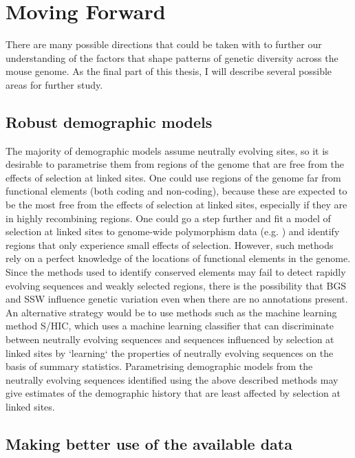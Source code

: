 \section{Moving Forward}	

	There are many possible directions that could be taken with to further our understanding of the factors that shape patterns of genetic diversity across the mouse genome. As the final part of this thesis, I will describe several possible areas for further study.
	
\subsection{Robust demographic models}

	The majority of demographic models assume neutrally evolving sites, so it is desirable to parametrise them from regions of the genome that are free from the effects of selection at linked sites. One could use regions of the genome far from functional elements (both coding and non-coding), because these are expected to be the most free from the effects of selection at linked sites, especially if they are in highly recombining regions. One could go a step further and fit a model of selection at linked sites to genome-wide polymorphism data (e.g. \citealt{RN274} ) and identify regions that only experience small effects of selection. However, such methods rely on a perfect knowledge of the locations of functional elements in the genome. Since the methods used to identify conserved elements may fail to detect rapidly evolving sequences and weakly selected regions, there is the possibility that BGS and SSW influence genetic variation even when there are no annotations present. An alternative strategy would be to use methods such as the machine learning method S/HIC, which uses a machine learning classifier that can discriminate between neutrally evolving sequences and sequences influenced by selection at linked sites by `learning` the properties of neutrally evolving sequences on the basis of summary statistics. Parametrising demographic models from the neutrally evolving sequences identified using the above described methods may give estimates of the demographic history that are least affected by selection at linked sites. 

\subsection{Making better use of the available data}

